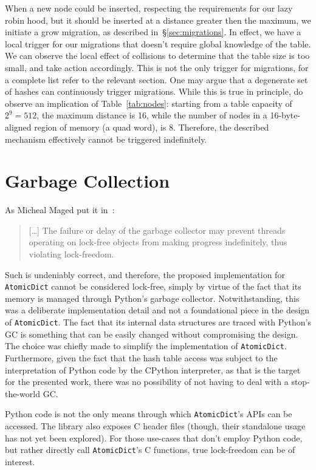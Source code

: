 When a new node could be inserted, respecting the requirements for our lazy robin hood, but it should be inserted at a distance greater then the maximum, we initiate a grow migration, as described in~\S\ref{sec:migrations}.
In effect, we have a local trigger for our migrations that doesn't require global knowledge of the table.
We can observe the local effect of collisions to determine that the table size is too small, and take action accordingly.
This is not the only trigger for migrations, for a complete list refer to the relevant section.
One may argue that a degenerate set of hashes can continuously trigger migrations.
While this is true in principle, do observe an implication of Table~\ref{tab:nodes}: starting from a table capacity of $2^9 = 512$, the maximum distance is 16, while the number of nodes in a 16-byte-aligned region of memory (a quad word), is 8.
Therefore, the described mechanism effectively cannot be triggered indefinitely.


\section{Garbage Collection}\label{sec:garbage-collection}

As Micheal Maged put it in~\cite[\S2.3]{micheal-hash-tables}:
\begin{quote}
[\ldots]
    The failure or delay of the garbage collector may prevent threads operating on lock-free objects from making progress indefinitely, thus violating lock-freedom.
\end{quote}

Such is undeniably correct, and therefore, the proposed implementation for \texttt{AtomicDict} cannot be considered lock-free, simply by virtue of the fact that its memory is managed through Python's garbage collector.
Notwithstanding, this was a deliberate implementation detail and not a foundational piece in the design of \texttt{AtomicDict}.
The fact that its internal data structures are traced with Python's GC is something that can be easily changed without compromising the design.
The choice was chiefly made to simplify the implementation of \texttt{AtomicDict}.
Furthermore, given the fact that the hash table access was subject to the interpretation of Python code by the CPython interpreter, as that is the target for the presented work, there was no possibility of not having to deal with a stop-the-world GC\@.

Python code is not the only means through which \texttt{AtomicDict}'s APIs can be accessed.
The library also exposes C header files (though, their standalone usage has not yet been explored).
For those use-cases that don't employ Python code, but rather directly call \texttt{AtomicDict}'s C functions, true lock-freedom can be of interest.

